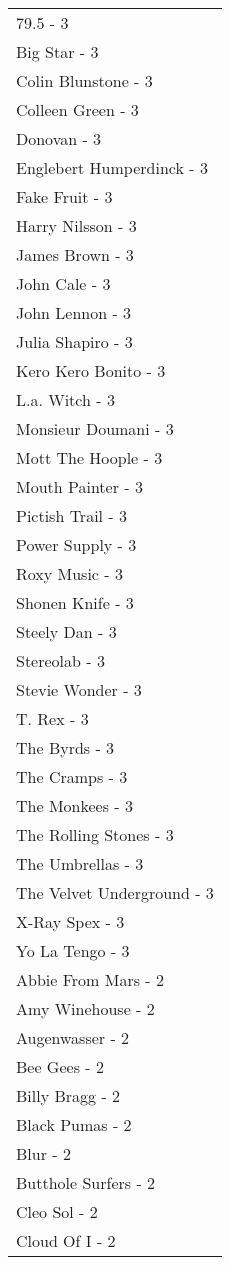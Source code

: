 \documentclass[
]{article}
\begin{document}
\begin{longtable}{l}
79.5 - 3 \\ 
Big Star - 3 \\ 
Colin Blunstone - 3 \\ 
Colleen Green - 3 \\ 
Donovan - 3 \\ 
Englebert Humperdinck - 3 \\ 
Fake Fruit - 3 \\ 
Harry Nilsson - 3 \\ 
James Brown - 3 \\ 
John Cale - 3 \\ 
John Lennon - 3 \\ 
Julia Shapiro - 3 \\ 
Kero Kero Bonito - 3 \\ 
L.a. Witch - 3 \\ 
Monsieur Doumani - 3 \\ 
Mott The Hoople - 3 \\ 
Mouth Painter - 3 \\ 
Pictish Trail - 3 \\ 
Power Supply - 3 \\ 
Roxy Music - 3 \\ 
Shonen Knife - 3 \\ 
Steely Dan - 3 \\ 
Stereolab - 3 \\ 
Stevie Wonder - 3 \\ 
T. Rex - 3 \\ 
The Byrds - 3 \\ 
The Cramps - 3 \\ 
The Monkees - 3 \\ 
The Rolling Stones - 3 \\ 
The Umbrellas - 3 \\ 
The Velvet Underground - 3 \\ 
X-Ray Spex - 3 \\ 
Yo La Tengo - 3 \\ 
Abbie From Mars - 2 \\ 
Amy Winehouse - 2 \\ 
Augenwasser - 2 \\ 
Bee Gees - 2 \\ 
Billy Bragg - 2 \\ 
Black Pumas - 2 \\ 
Blur - 2 \\ 
Butthole Surfers - 2 \\ 
Cleo Sol - 2 \\ 
Cloud Of I - 2 \\ 

\end{longtable}
\end{document}

